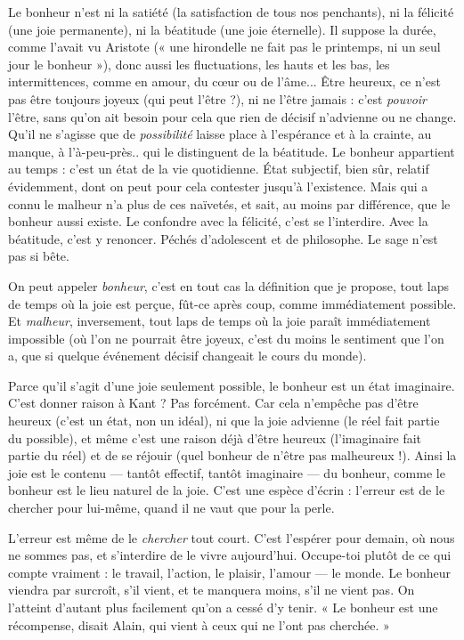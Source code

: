 Le bonheur n’est ni la satiété (la satisfaction de tous nos penchants), ni la
félicité (une joie permanente), ni la béatitude (une joie éternelle). Il suppose la
durée, comme l’avait vu Aristote (« une hirondelle ne fait pas le printemps, ni
un seul jour le bonheur »), donc aussi les fluctuations, les hauts et les bas, les
intermittences, comme en amour, du cœur ou de l'âme... Être heureux, ce
n'est pas être toujours joyeux (qui peut l'être ?), ni ne l’être jamais : c’est {\it pouvoir}
l'être, sans qu’on ait besoin pour cela que rien de décisif n’advienne ou ne
change. Qu'il ne s'agisse que de {\it possibilité} laisse place à l’espérance et à la
crainte, au manque, à l’à-peu-près.. qui le distinguent de la béatitude. Le bonheur
appartient au temps : c’est un état de la vie quotidienne. État subjectif,
bien sûr, relatif évidemment, dont on peut pour cela contester jusqu’à l’existence.
Mais qui a connu le malheur n’a plus de ces naïvetés, et sait, au moins
par différence, que le bonheur aussi existe. Le confondre avec la félicité, c’est se
l’interdire. Avec la béatitude, c’est y renoncer. Péchés d’adolescent et de philosophe.
Le sage n’est pas si bête.

On peut appeler {\it bonheur}, c’est en tout cas la définition que je propose, tout
laps de temps où la joie est perçue, fût-ce après coup, comme immédiatement
possible. Et {\it malheur}, inversement, tout laps de temps où la joie paraît immédiatement
impossible (où l’on ne pourrait être joyeux, c’est du moins le sentiment
que l’on a, que si quelque événement décisif changeait le cours du
monde).

Parce qu’il s’agit d’une joie seulement possible, le bonheur est un état imaginaire.
C’est donner raison à Kant ? Pas forcément. Car cela n’empêche pas
d’être heureux (c’est un état, non un idéal), ni que la joie advienne (le réel fait
partie du possible), et même c’est une raison déjà d’être heureux (l’imaginaire
fait partie du réel) et de se réjouir (quel bonheur de n’être pas malheureux !).
Ainsi la joie est le contenu — tantôt effectif, tantôt imaginaire — du bonheur,
comme le bonheur est le lieu naturel de la joie. C’est une espèce d’écrin :
l'erreur est de le chercher pour lui-même, quand il ne vaut que pour la perle.

L'erreur est même de le {\it chercher} tout court. C’est l’espérer pour demain,
où nous ne sommes pas, et s’interdire de le vivre aujourd’hui. Occupe-toi
plutôt de ce qui compte vraiment : le travail, l’action, le plaisir, l'amour — le
monde. Le bonheur viendra par surcroît, s’il vient, et te manquera moins, s’il
ne vient pas. On l’atteint d’autant plus facilement qu’on a cessé d’y tenir. « Le
bonheur est une récompense, disait Alain, qui vient à ceux qui ne l’ont pas
cherchée. »

